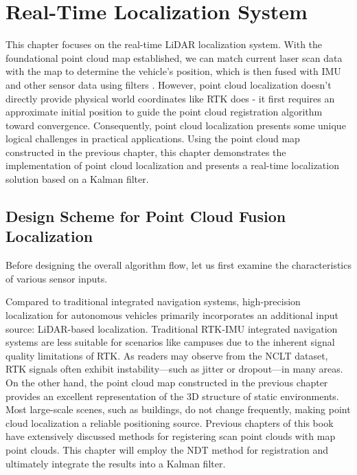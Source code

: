 \thispagestyle{empty}

\chapter{Real-Time Localization System}
\thispagestyle{empty}
\label{cpt:localization}

This chapter focuses on the real-time LiDAR localization system. With the foundational point cloud map established, we can match current laser scan data with the map to determine the vehicle's position, which is then fused with IMU and other sensor data using filters \cite{Wang2017}. However, point cloud localization doesn't directly provide physical world coordinates like RTK does - it first requires an approximate initial position to guide the point cloud registration algorithm toward convergence. Consequently, point cloud localization presents some unique logical challenges in practical applications. Using the point cloud map constructed in the previous chapter, this chapter demonstrates the implementation of point cloud localization and presents a real-time localization solution based on a Kalman filter.



\section{Design Scheme for Point Cloud Fusion Localization}  
Before designing the overall algorithm flow, let us first examine the characteristics of various sensor inputs.

Compared to traditional integrated navigation systems, high-precision localization for autonomous vehicles primarily incorporates an additional input source: LiDAR-based localization. Traditional RTK-IMU integrated navigation systems are less suitable for scenarios like campuses due to the inherent signal quality limitations of RTK. As readers may observe from the NCLT dataset, RTK signals often exhibit instability—such as jitter or dropout—in many areas. On the other hand, the point cloud map constructed in the previous chapter provides an excellent representation of the 3D structure of static environments. Most large-scale scenes, such as buildings, do not change frequently, making point cloud localization a reliable positioning source. Previous chapters of this book have extensively discussed methods for registering scan point clouds with map point clouds. This chapter will employ the NDT method for registration and ultimately integrate the results into a Kalman filter.

